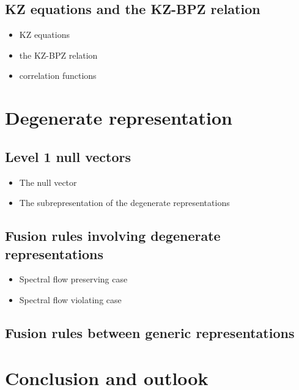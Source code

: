 \documentclass[10pt,a4paper]{article}
\numberwithin{equation}{section}
\begin{document}
\subsection{KZ equations and the KZ-BPZ relation}
\begin{itemize}
    \item KZ equations
    \item the KZ-BPZ relation
    \item correlation functions
\end{itemize}

\section{Degenerate representation}

\subsection{Level 1 null vectors}
\begin{itemize}
    \item The null vector 
    \item The subrepresentation of the degenerate representations
\end{itemize}

\subsection{Fusion rules involving degenerate representations}
\begin{itemize}
    \item Spectral flow preserving case
    \item Spectral flow violating case
\end{itemize}

\subsection{Fusion rules between generic representations}

\section{Conclusion and outlook}
\end{document}
